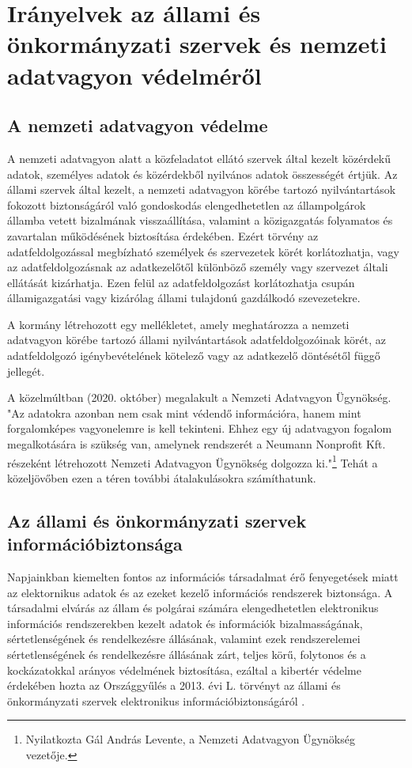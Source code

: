\section{Irányelvek az állami és önkormányzati szervek és nemzeti adatvagyon védelméről}

\subsection*{A nemzeti adatvagyon védelme}

A nemzeti adatvagyon alatt a közfeladatot ellátó szervek által kezelt közérdekű adatok, személyes adatok és közérdekből nyilvános adatok összességét értjük. Az állami szervek által kezelt, a nemzeti adatvagyon körébe tartozó nyilvántartások fokozott biztonságáról való gondoskodás elengedhetetlen az állampolgárok államba vetett bizalmának visszaállítása, valamint a közigazgatás folyamatos és zavartalan működésének biztosítása érdekében. Ezért törvény az adatfeldolgozással megbízható személyek és szervezetek körét korlátozhatja, vagy az adatfeldolgozásnak az adatkezelőtől különböző személy vagy szervezet általi ellátását kizárhatja. Ezen felül az adatfeldolgozást korlátozhatja csupán államigazgatási vagy kizárólag állami tulajdonú gazdálkodó szevezetekre. \cite{2010-CLVII-torveny}

A kormány létrehozott egy mellékletet, amely meghatározza a nemzeti adatvagyon körébe tartozó állami nyilvántartások adatfeldolgozóinak körét, az adatfeldolgozó igénybevételének kötelező vagy az adatkezelő döntésétől függő jellegét. \cite{38/2011}

A közelmúltban (2020. október) megalakult a Nemzeti Adatvagyon Ügynökség. "Az adatokra azonban nem csak mint védendő információra, hanem mint forgalomképes vagyonelemre is kell tekinteni. Ehhez egy új adatvagyon fogalom megalkotására is szükség van, amelynek rendszerét a Neumann Nonprofit Kft. részeként létrehozott Nemzeti Adatvagyon Ügynökség dolgozza ki."\footnote{Nyilatkozta Gál András Levente, a Nemzeti Adatvagyon Ügynökség vezetője.} Tehát a közeljövőben ezen a téren további átalakulásokra számíthatunk.

\subsection*{Az állami és önkormányzati szervek információbiztonsága}

Napjainkban kiemelten fontos az információs társadalmat érő fenyegetések miatt az elektornikus adatok és az ezeket kezelő információs rendszerek biztonsága. A társadalmi elvárás az állam és polgárai számára elengedhetetlen elektronikus információs rendszerekben kezelt adatok és információk bizalmasságának, sértetlenségének és rendelkezésre állásának, valamint ezek rendszerelemei sértetlenségének és rendelkezésre állásának zárt, teljes körű, folytonos és a kockázatokkal arányos védelmének biztosítása, ezáltal a kibertér védelme érdekében hozta az Országgyűlés a 2013. évi L. törvényt az állami és önkormányzati szervek elektronikus információbiztonságáról \cite{2013-L-torveny}.

